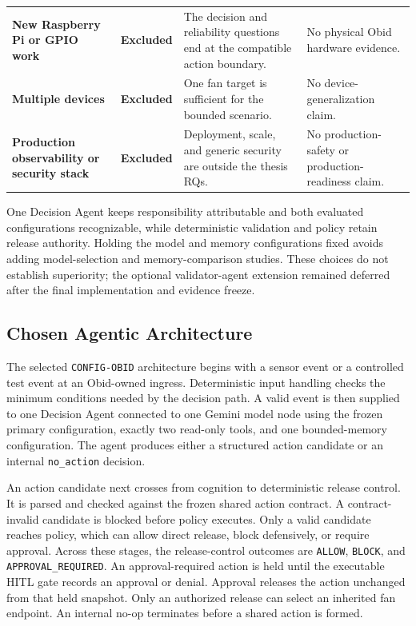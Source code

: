\begin{table}[H]
\begin{tabularx}{\textwidth}{
  @{}
  L{0.18\textwidth}
  L{0.13\textwidth}
  L{0.31\textwidth}
  Y
  @{}
}
\textbf{New Raspberry Pi or GPIO work}
&
\textbf{Excluded}
&
The decision and reliability questions end at the compatible action
boundary.
&
No physical Obid hardware evidence.
\\
\addlinespace[1.5pt]

\textbf{Multiple devices}
&
\textbf{Excluded}
&
One fan target is sufficient for the bounded scenario.
&
No device-generalization claim.
\\
\addlinespace[1.5pt]

\textbf{Production observability or security stack}
&
\textbf{Excluded}
&
Deployment, scale, and generic security are outside the thesis RQs.
&
No production-safety or production-readiness claim.
\\

\bottomrule
\end{tabularx}
\endgroup
\end{table}

One Decision Agent keeps responsibility attributable and both evaluated
configurations recognizable, while deterministic validation and policy retain
release authority. Holding the model and memory configurations fixed avoids
adding model-selection and memory-comparison studies. These choices do not
establish superiority; the optional validator-agent extension remained deferred
after the final implementation and evidence freeze.

\subsection{Chosen Agentic Architecture}\label{subsec:design-architecture}

The selected \texttt{CONFIG-OBID} architecture begins with a sensor event or a
controlled test event at an Obid-owned ingress. Deterministic input handling
checks the minimum conditions needed by the decision path. A valid event is
then supplied to one Decision Agent connected to one Gemini model node using
the frozen primary configuration, exactly two read-only tools, and one bounded-memory
configuration. The agent produces either a structured action candidate or an
internal \texttt{no\_action} decision.

An action candidate next crosses from cognition to deterministic release
control. It is parsed and checked against the frozen shared action contract. A
contract-invalid candidate is blocked before policy executes. Only a valid
candidate reaches policy, which can allow direct release, block defensively, or
require approval. Across these stages, the release-control outcomes are
\texttt{ALLOW}, \texttt{BLOCK}, and \mbox{\texttt{APPROVAL\_REQUIRED}}. An
approval-required action is held until the executable HITL gate records an
approval or denial. Approval releases the action unchanged from that held
snapshot. Only an authorized release can select an inherited fan endpoint. An
internal no-op terminates before a shared action is formed.

